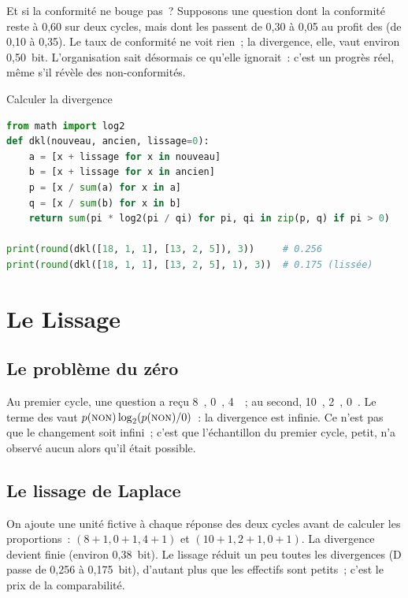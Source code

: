 \begin{boiteRemarque}{Et si la conformité ne bouge pas~?}
Supposons une question dont la conformité reste à 0,60 sur deux cycles,
mais dont les \NEK{} passent de 0,30 à 0,05 au profit des \NON{} (de 0,10
à 0,35). Le taux de conformité ne voit rien~; la divergence, elle, vaut
environ 0,50~bit. L'organisation sait désormais ce qu'elle ignorait~:
c'est un progrès réel, même s'il révèle des non-conformités.
\end{boiteRemarque}

\begin{boxoutils}{Calculer la divergence}
\begin{lstlisting}[language=Python]
from math import log2
def dkl(nouveau, ancien, lissage=0):
    a = [x + lissage for x in nouveau]
    b = [x + lissage for x in ancien]
    p = [x / sum(a) for x in a]
    q = [x / sum(b) for x in b]
    return sum(pi * log2(pi / qi) for pi, qi in zip(p, q) if pi > 0)

print(round(dkl([18, 1, 1], [13, 2, 5]), 3))     # 0.256
print(round(dkl([18, 1, 1], [13, 2, 5], 1), 3))  # 0.175 (lissée)
\end{lstlisting}
\end{boxoutils}

\section{Le Lissage}
\label{sec:c12-lissage}

\subsection{Le problème du zéro}

Au premier cycle, une question a reçu 8~\OUI{}, 0~\NON{}, 4~\NEK{}~; au
second, 10~\OUI{}, 2~\NON{}, 0~\NEK{}. Le terme des \NON{} vaut
$p(\textsc{non})\log_2(p(\textsc{non})/0)$~: la divergence est infinie. Ce n'est pas que le
changement soit infini~; c'est que l'échantillon du premier cycle, petit,
n'a observé aucun \NON{} alors qu'il était possible.

\subsection{Le lissage de Laplace}

On ajoute une unité fictive à chaque réponse des deux cycles avant de
calculer les proportions~: $(8+1, 0+1, 4+1)$ et $(10+1, 2+1, 0+1)$. La
divergence devient finie (environ 0,38~bit). Le lissage réduit un peu toutes
les divergences (D passe de 0,256 à 0,175~bit), d'autant plus que les
effectifs sont petits~; c'est le prix de la comparabilité.

